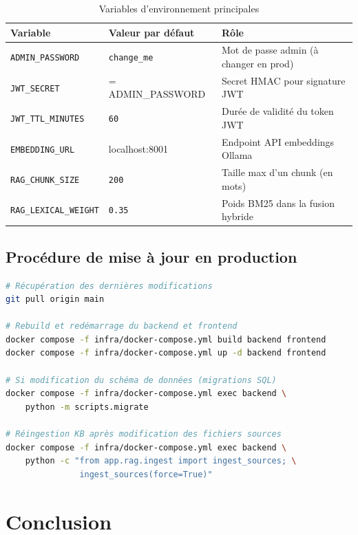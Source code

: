 \documentclass[12pt,a4paper]{report}
\begin{document}
\begin{table}[H]
\centering
\caption{Variables d'environnement principales}
\small
\begin{tabularx}{\textwidth}{|l|l|X|}
\hline
\rowcolor{tableheader}
\textbf{Variable} & \textbf{Valeur par défaut} & \textbf{Rôle} \\
\hline
\texttt{ADMIN\_PASSWORD} & \texttt{change\_me} & Mot de passe admin (à changer en prod) \\
\hline
\texttt{JWT\_SECRET} & = ADMIN\_PASSWORD & Secret HMAC pour signature JWT \\
\hline
\texttt{JWT\_TTL\_MINUTES} & \texttt{60} & Durée de validité du token JWT \\
\hline
\texttt{EMBEDDING\_URL} & localhost:8001 & Endpoint API embeddings Ollama \\
\hline
\texttt{RAG\_CHUNK\_SIZE} & \texttt{200} & Taille max d'un chunk (en mots) \\
\hline
\texttt{RAG\_LEXICAL\_WEIGHT} & \texttt{0.35} & Poids BM25 dans la fusion hybride \\
\hline
\end{tabularx}
\label{tab:env}
\end{table}

\subsection{Procédure de mise à jour en production}

\begin{lstlisting}[language=bash, caption={Procédure de mise à jour sur le serveur},
                   label={lst:deploy}]
# Récupération des dernières modifications
git pull origin main

# Rebuild et redémarrage du backend et frontend
docker compose -f infra/docker-compose.yml build backend frontend
docker compose -f infra/docker-compose.yml up -d backend frontend

# Si modification du schéma de données (migrations SQL)
docker compose -f infra/docker-compose.yml exec backend \
    python -m scripts.migrate

# Réingestion KB après modification des fichiers sources
docker compose -f infra/docker-compose.yml exec backend \
    python -c "from app.rag.ingest import ingest_sources; \
               ingest_sources(force=True)"
\end{lstlisting}

\section{Conclusion}
\end{document}
